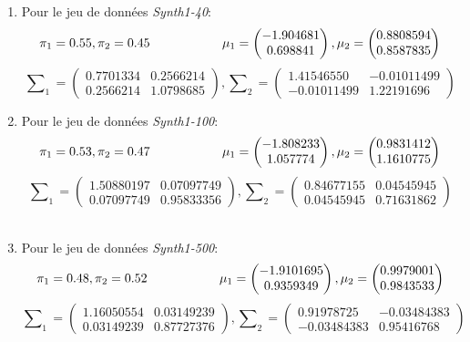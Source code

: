 \documentclass[a4paper,11pt]{article}
\begin{document}
\begin{enumerate}
  \item Pour le jeu de données \textit{Synth1-40}:
  \[ \pi_1  = 0.55, \pi_2  = 0.45 \hspace*{2cm} 
  \mu_1  = \begin{pmatrix}
    -1.904681 \\ 0.698841
  \end{pmatrix},
  \mu_2  = \begin{pmatrix}
    0.8808594 \\ 0.8587835
  \end{pmatrix}\]
  \[ \sum\nolimits_1 = \begin{pmatrix}
   0.7701334  & 0.2566214 \\
   0.2566214 & 1.0798685 
  \end{pmatrix},
  \sum\nolimits_2 = \begin{pmatrix}
  1.41546550  & -0.01011499 \\
  -0.01011499 & 1.22191696 
  \end{pmatrix}\]
  
  \item Pour le jeu de données \textit{Synth1-100}:
  \[ \pi_1  = 0.53, \pi_2  = 0.47\hspace*{2cm} 
   \mu_1  = \begin{pmatrix} -1.808233 \\ 1.057774 \end{pmatrix},
     \mu_2  = \begin{pmatrix} 0.9831412 \\ 1.1610775 \end{pmatrix}\]
  \[ \sum\nolimits_1 = \begin{pmatrix}
   1.50880197  & 0.07097749 \\
   0.07097749 & 0.95833356 
  \end{pmatrix},
  \sum\nolimits_2 = \begin{pmatrix}
  0.84677155  & 0.04545945 \\
  0.04545945 & 0.71631862 
  \end{pmatrix}\]  \\
  
  \item Pour le jeu de données \textit{Synth1-500}:
  \[ \pi_1  = 0.48, \pi_2  = 0.52\hspace*{2cm} 
   \mu_1  = \begin{pmatrix} -1.9101695 \\ 0.9359349 \end{pmatrix},
     \mu_2  = \begin{pmatrix} 0.9979001 \\ 0.9843533 \end{pmatrix}\]
  \[ \sum\nolimits_1 = \begin{pmatrix}
   1.16050554  & 0.03149239 \\
   0.03149239 & 0.87727376 
  \end{pmatrix},
  \sum\nolimits_2 = \begin{pmatrix}
  0.91978725  & -0.03484383 \\
  -0.03484383 & 0.95416768 
  \end{pmatrix}\] \\
  

\end{enumerate}
\end{document}

